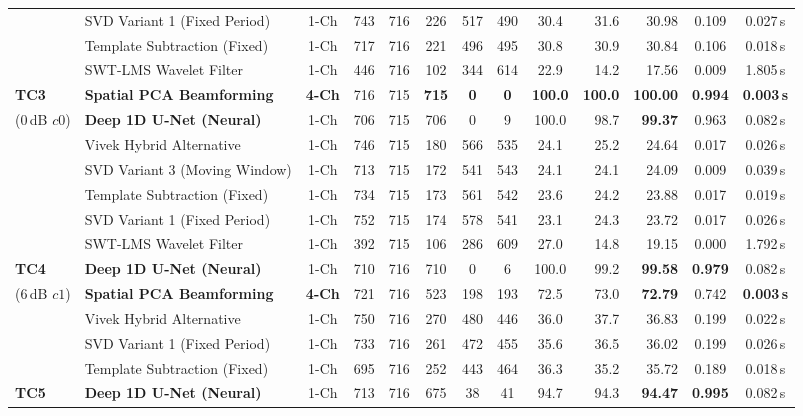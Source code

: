 \documentclass[10pt,twocolumn,letterpaper]{article}
\begin{document}
\begin{table}[t]
{\begin{tabular}{@{}llcccccccrrcc@{}}
& SVD Variant 1 (Fixed Period) & 1-Ch & 743 & 716 & 226 & 517 & 490 & 30.4 & 31.6 & 30.98 & 0.109 & 0.027\,s \\
& Template Subtraction (Fixed) & 1-Ch & 717 & 716 & 221 & 496 & 495 & 30.8 & 30.9 & 30.84 & 0.106 & 0.018\,s \\
& SWT-LMS Wavelet Filter & 1-Ch & 446 & 716 & 102 & 344 & 614 & 22.9 & 14.2 & 17.56 & 0.009 & 1.805\,s \\
\midrule
\textbf{TC3} & \textbf{Spatial PCA Beamforming} & \textbf{4-Ch} & 716 & 715 & \textbf{715} & \textbf{0} & \textbf{0} & \textbf{100.0} & \textbf{100.0} & \textbf{100.00} & \textbf{0.994} & \textbf{0.003\,s} \\
(0\,dB $c0$)  & \textbf{Deep 1D U-Net (Neural)} & 1-Ch & 706 & 715 & 706 & 0 & 9 & 100.0 & 98.7 & \textbf{99.37} & 0.963 & 0.082\,s \\
& Vivek Hybrid Alternative & 1-Ch & 746 & 715 & 180 & 566 & 535 & 24.1 & 25.2 & 24.64 & 0.017 & 0.026\,s \\
& SVD Variant 3 (Moving Window)& 1-Ch & 713 & 715 & 172 & 541 & 543 & 24.1 & 24.1 & 24.09 & 0.009 & 0.039\,s \\
& Template Subtraction (Fixed) & 1-Ch & 734 & 715 & 173 & 561 & 542 & 23.6 & 24.2 & 23.88 & 0.017 & 0.019\,s \\
& SVD Variant 1 (Fixed Period) & 1-Ch & 752 & 715 & 174 & 578 & 541 & 23.1 & 24.3 & 23.72 & 0.017 & 0.026\,s \\
& SWT-LMS Wavelet Filter & 1-Ch & 392 & 715 & 106 & 286 & 609 & 27.0 & 14.8 & 19.15 & 0.000 & 1.792\,s \\
\midrule
\textbf{TC4} & \textbf{Deep 1D U-Net (Neural)} & 1-Ch & 710 & 716 & 710 & 0 & 6 & 100.0 & 99.2 & \textbf{99.58} & \textbf{0.979} & 0.082\,s \\
(6\,dB $c1$)  & \textbf{Spatial PCA Beamforming} & \textbf{4-Ch} & 721 & 716 & 523 & 198 & 193 & 72.5 & 73.0 & \textbf{72.79} & 0.742 & \textbf{0.003\,s} \\
& Vivek Hybrid Alternative & 1-Ch & 750 & 716 & 270 & 480 & 446 & 36.0 & 37.7 & 36.83 & 0.199 & 0.022\,s \\
& SVD Variant 1 (Fixed Period) & 1-Ch & 733 & 716 & 261 & 472 & 455 & 35.6 & 36.5 & 36.02 & 0.199 & 0.026\,s \\
& Template Subtraction (Fixed) & 1-Ch & 695 & 716 & 252 & 443 & 464 & 36.3 & 35.2 & 35.72 & 0.189 & 0.018\,s \\
\midrule
\textbf{TC5} & \textbf{Deep 1D U-Net (Neural)} & 1-Ch & 713 & 716 & 675 & 38 & 41 & 94.7 & 94.3 & \textbf{94.47} & \textbf{0.995} & 0.082\,s \\

\end{tabular}}
\end{table}
\end{document}

